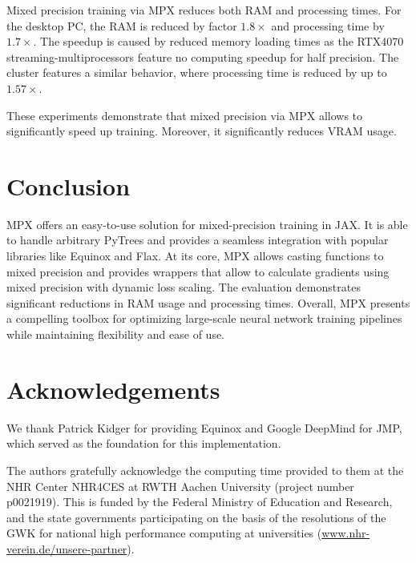 \documentclass[copyright, logo]{dsme}
\newcommand{\mpx}{\textsc{MPX}}
\begin{document}
Mixed precision training via \mpx{} reduces both RAM and processing times.
For the desktop PC, the RAM is reduced by factor $1.8\times$ and processing time by $1.7\times$.
The speedup is caused by reduced memory loading times as the RTX4070 streaming-multiprocessors feature no computing speedup for half precision.
The cluster features a similar behavior, where processing time is reduced by up to $1.57\times$.

These experiments demonstrate that mixed precision via \mpx{} allows to significantly speed up training.
Moreover, it significantly reduces VRAM usage.


\section{Conclusion}

\mpx{} offers an easy-to-use solution for mixed-precision training in JAX.
It is able to handle arbitrary PyTrees and provides a seamless integration with popular libraries like Equinox and Flax. 
At its core, \mpx{} allows casting functions to mixed precision and provides wrappers that allow to calculate gradients using mixed precision with dynamic loss scaling.
The evaluation demonstrates significant reductions in RAM usage and processing times. 
Overall, MPX presents a compelling toolbox for optimizing large-scale neural network training pipelines while maintaining flexibility and ease of use.


\section{Acknowledgements}
We thank Patrick Kidger for providing Equinox and Google DeepMind for JMP, which served as the foundation for this implementation.

The authors gratefully acknowledge the computing time provided to them at the NHR Center NHR4CES at RWTH Aachen University (project number p0021919). This is funded by the Federal Ministry of Education and Research, and the state governments participating on the basis of the resolutions of the GWK for national high performance computing at universities (\url{www.nhr-verein.de/unsere-partner}).


\end{document}

